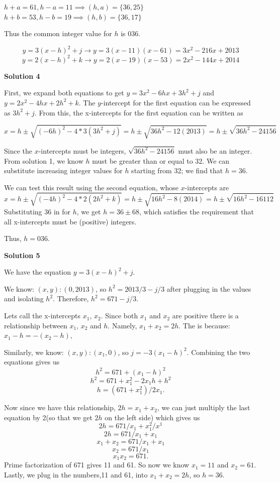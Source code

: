 \begin{enumerate}
 $h+a=61,h-a=11\implies (h,a)=\{36,25\}$
$h+b=53,h-b=19\implies (h,b)=\{36,17\}$

 Thus the common integer value for $h$ is $\boxed{036}$.

 
 \[y=3(x-h)^2+j\rightarrow y=3(x-11)(x-61)=3x^2-216x+2013\]
 \[y=2(x-h)^2+k\rightarrow y=2(x-19)(x-53)=2x^2-144x+2014\]




\textbf{Solution 4}

First, we expand both equations to get $y=3x^2-6hx+3h^2+j$ and $y=2x^2-4hx+2h^2+k$. The $y$-intercept for the first equation can be expressed as $3h^2+j$. From this, the x-intercepts for the first equation can be written as 

 
 \[x=h \pm \sqrt{(-6h)^2-4*3(3h^2+j)}=h \pm \sqrt{36h^2-12(2013)}=h \pm \sqrt{36h^2-24156}\]

 Since the $x$-intercepts must be integers, $\sqrt{36h^2-24156}$ must also be an integer. From solution 1, we know  $h$ must be greater than or equal to 32. We can substitute increasing integer values for $h$ starting from 32; we find that $h=36$. 

 We can test this result using the second equation, whose $x$-intercepts are 
 \[x=h \pm \sqrt{(-4h)^2-4*2(2h^2+k)}=h \pm \sqrt{16h^2-8(2014)}=h \pm \sqrt{16h^2-16112}\] Substituting 36 in for $h$, we get $h=36 \pm 68$, which satisfies the requirement that all x-intercepts must be (positive) integers.

 Thus, $h=\boxed{036}$.

 



\textbf{Solution 5}

We have the equation $y=3(x-h)^2 + j.$

 We know: $(x,y):(0,2013)$, so $h^2=2013/3 - j/3$ after plugging in the values and isolating $h^2$. Therefore, $h^2=671-j/3$.

 Lets call the x-intercepts $x_1$, $x_2$. Since both $x_1$ and $x_2$ are positive there is a relationship between $x_1$, $x_2$ and $h$. Namely, $x_1+x_2=2h$. The is because: $x_1-h=-(x_2-h)$, 

 Similarly, we know: $(x,y):(x_1,0)$, so $j=-3(x_1-h)^2$. Combining the two equations gives us 
 \[h^2=671+(x_1-h)^2\]
 \[h^2=671+x_1^2-2x_1h+h^2\]
 \[h=(671+x_1^2)/2x_1.\]

 Now since we have this relationship, $2h=x_1+x_2$, we can just multiply the last equation by 2(so that we get $2h$ on the left side) which gives us 
 \[2h=671/x_1+x_1^2/x^1\] 
 \[2h=671/x_1+x_1\] 
 \[x_1+x_2=671/x_1+x_1\] 
 \[x_2=671/x_1\] 
 \[x_1x_2=671.\] Prime factorization of 671 gives 11 and 61. So now we know $x_1=11$ and $x_2=61$. Lastly, we plug in the numbers,11 and 61, into $x_1+x_2=2h$, so $\boxed{h=36}$.


\end{enumerate}
